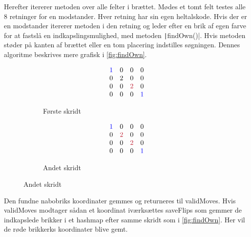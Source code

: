 Herefter itererer metoden over alle felter i brættet. Mødes et tomt felt testes alle 8 retninger for en modstander. Hver retning har sin egen heltalskode. Hvis der er en modstander itererer metoden i den retning og leder efter en brik af egen farve for at fastslå en indkapslingsmulighed, med metoden \texttt|findOwn()|. Hvis metoden støder på kanten af brættet eller en tom placering indstilles søgningen. Dennes algoritme beskrives mere grafisk i \cref{fig:findOwn}.
\begin{figure}[H]
    \centering
    \caption{\texttt|findOwn()| leder efter en indkapsling i nordvestlig retning (heltalskode 1).}\label{fig:findOwn}
    \begin{subfigure}[t]{.3\textwidth}
        \caption{Første skridt}
        \begin{align*}
            \begin{array}{cccc}
                \color{blue}1 & 0 & 0               & 0             \\
                0             & 2 & 0               & 0             \\
                0             & 0 & \color{DTUred}2 & 0             \\
                0             & 0 & 0               & \color{blue}1
            \end{array}
        \end{align*}
    \end{subfigure}
    \hfil
    \begin{subfigure}[t]{.3\textwidth}
        \caption{Andet skridt}
        \begin{align*}
            \begin{array}{cccc}
                \color{blue}1 & 0               & 0               & 0             \\
                0             & \color{DTUred}2 & 0               & 0             \\
                0             & 0               & \color{DTUred}2 & 0             \\
                0             & 0               & 0               & \color{blue}1
            \end{array}
        \end{align*}
    \end{subfigure}
\end{figure}
Den fundne nabobriks koordinater gemmes og returneres til validMoves. Hvis validMoves modtager sådan et koordinat iværksættes saveFlips som gemmer de indkapslede brikker i et hashmap efter samme skridt som i \cref{fig:findOwn}. Her vil de røde brikkerks koordinater blive gemt.\newline
